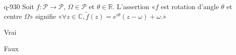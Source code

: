 \begin{truefalse}{q-930}
Soit $f:\mathcal P\to \mathcal P$, $\Omega\in\mathcal P$ et $\theta\in\mathbb R$. L'assertion «$f$ est rotation d'angle $\theta$ et centre $\Omega$» signifie «$\forall z\in\mathbb C, \tilde f(z)=e^{i\theta}(z-\omega)+\omega$.»
\item* Vrai
\item Faux
\end{truefalse}

